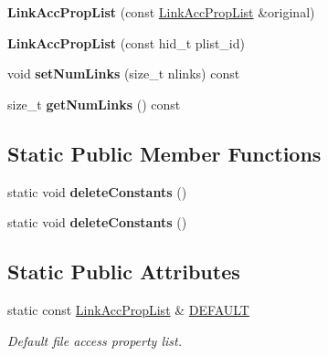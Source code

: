 \begin{DoxyCompactItemize}
{\bfseries Link\+Acc\+Prop\+List} (const \hyperlink{class_h5_1_1_link_acc_prop_list}{Link\+Acc\+Prop\+List} \&original)
\item 
\mbox{\label{class_h5_1_1_link_acc_prop_list_a8df333c1d568e0aec0c8cdd90cdd4382}} 
{\bfseries Link\+Acc\+Prop\+List} (const hid\+\_\+t plist\+\_\+id)
\item 
\mbox{\label{class_h5_1_1_link_acc_prop_list_a4c8db7173d759889d07010f1c8604985}} 
void {\bfseries set\+Num\+Links} (size\+\_\+t nlinks) const
\item 
\mbox{\label{class_h5_1_1_link_acc_prop_list_ac352ea2d96ffbff5dfbeec6f1c203166}} 
size\+\_\+t {\bfseries get\+Num\+Links} () const
\end{DoxyCompactItemize}
\subsection*{Static Public Member Functions}
\begin{DoxyCompactItemize}
\item 
\mbox{\label{class_h5_1_1_link_acc_prop_list_a0eb5da707f5ce927bb81a487dc53f069}} 
static void {\bfseries delete\+Constants} ()
\item 
\mbox{\label{class_h5_1_1_link_acc_prop_list_a0eb5da707f5ce927bb81a487dc53f069}} 
static void {\bfseries delete\+Constants} ()
\end{DoxyCompactItemize}
\subsection*{Static Public Attributes}
\begin{DoxyCompactItemize}
\item 
\mbox{\label{class_h5_1_1_link_acc_prop_list_abbf34b03d8f8c9cf225c704d59ebb7a8}} 
static const \hyperlink{class_h5_1_1_link_acc_prop_list}{Link\+Acc\+Prop\+List} \& \hyperlink{class_h5_1_1_link_acc_prop_list_abbf34b03d8f8c9cf225c704d59ebb7a8}{D\+E\+F\+A\+U\+LT}
\begin{DoxyCompactList}\small\item\em Default file access property list. \end{DoxyCompactList}\end{DoxyCompactItemize}
